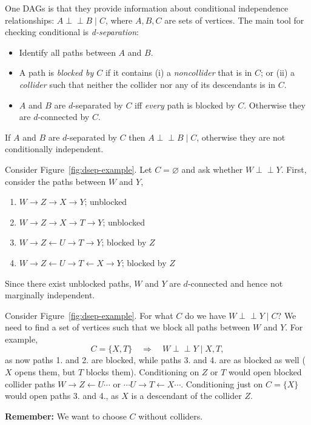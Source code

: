 \documentclass[11pt]{exam}
\begin{document}
One  DAGs is that they provide information about conditional independence relationships:  \(A \perp\!\!\!\perp B \mid C\), where \(A,B,C\) are sets of vertices. The main tool for checking conditional is \emph{d-separation}:

\begin{itemize}[leftmargin=*, itemsep=0.25em]
  \item Identify all paths between \(A\) and \(B\).
  \item A path is \emph{blocked by \(C\)} if it contains
        (i) a \emph{noncollider} that is in \(C\); or
        (ii) a \emph{collider} such that neither the collider nor any of its descendants is in \(C\).
  \item \(A\) and \(B\) are \(d\)-separated by \(C\) iff \emph{every} path is blocked by \(C\). Otherwise they are  \(d\)-connected by \(C\).
\end{itemize}
If \(A\) and \(B\) are \(d\)-separated by \(C\) then \(A \perp\!\!\!\perp B \mid C\), otherwise they are not conditionally independent.

\begin{example}
    Consider Figure~\ref{fig:dsep-example}. Let \(C=\varnothing\) and ask whether \(W \perp\!\!\!\perp Y\).
    First, consider the paths between $W$ and $Y$,
    \begin{enumerate}
        \item $ W \to Z \to X \to Y$; unblocked
        \item $W \to Z \to X \to T \to Y$; unblocked
        \item $W \to Z \leftarrow U \to T \to Y$; blocked by $Z$
        \item $W \to Z \leftarrow U \to T \leftarrow X \to Y$; blocked by $Z$
    \end{enumerate}
    Since there exist unblocked paths, \(W\) and \(Y\) are \(d\)-connected and hence not marginally independent.
\end{example}

\begin{example}
    Consider Figure~\ref{fig:dsep-example}. For what $C$ do we have \(W \perp\!\!\!\perp Y \mid C\)?
    We need to find a set of vertices such that we block all paths between $W$ and $Y$. For example,
    \[
    C=\{X, T\}\quad\Rightarrow\quad
    W \perp\!\!\!\perp Y \mid X, T ,
    \]
    as now paths 1. and 2. are blocked, while paths 3. and 4. are as blocked as well ($X$ opens them, but $T$ blocks them).
    Conditioning on \(Z\) or \(T\) would open blocked collider paths
\(W \to Z \leftarrow U \cdots\) or \(\cdots U \to T \leftarrow X \cdots\). 
Conditioning just on $C = \{X\}$ would open paths 3. and 4., as $X$ is a descendant of the collider $Z$.
\end{example}
\noindent
\textbf{Remember:} We want to choose $C$ without colliders.
\end{document}
